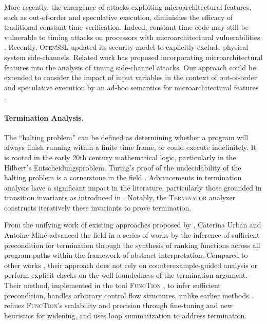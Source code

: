 More recently, the emergence of attacks exploiting microarchitectural features, such as out-of-order and speculative execution, diminishes the efficacy of traditional constant-time verification. Indeed, constant-time code may still be vulnerable to timing attacks on processors with microarchitectural vulnerabilities . Recently, \textsc{OpenSSL} updated its security model to explicitly exclude physical system side-channels. Related work  has proposed incorporating microarchitectural features into the analysis of timing side-channel attacks. Our approach could be extended to consider the impact of input variables in the context of out-of-order and speculative execution by an ad-hoc semantics for microarchitectural features .

\paragraph{Termination Analysis.}


The ``halting problem'' can be defined as determining whether a program will always finish running within a finite time frame, or could execute indefinitely.
It is rooted in the early 20th century mathematical logic, particularly in the Hilbert's Entscheidungsproblem. Turing's proof of the undecidability of the halting problem is a cornerstone in the field .
Advancements in termination analysis have a significant impact in the literature, particularly those grounded in transition invariants as introduced in \textcite{Podelski2004}. Notably, the \textsc{Terminator} analyzer  constructs iteratively these invariants to prove termination.

From the unifying work of existing approaches proposed by ,
Caterina Urban and Antoine Min{\'{e}} advanced the field in a series of works  by the inference of sufficient precondition for termination through the synthesis of ranking functions across all program paths within the framework of abstract interpretation.
Compared to other works , their approach does not rely on counterexample-guided analysis or perform explicit checks on the well-foundedness of the termination argument. Their method, implemented in the tool \textsc{FuncTion} , to infer sufficient precondition, handles arbitrary control flow structures, unlike earlier methods .  refines \textsc{FuncTion}'s scalability and precision through fine-tuning and new heuristics for widening, and  uses loop summarization to address termination.

